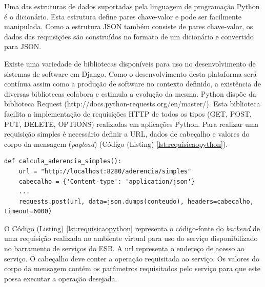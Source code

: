 Uma das estruturas de dados suportadas pela linguagem de programação Python é o dicionário. Esta estrutura define pares chave-valor e pode ser facilmente manipulada. Como a estrutura JSON também consiste de pares chave-valor, os dados das requisições são construídos no formato de um dicionário e convertido para JSON.

Existe uma variedade de bibliotecas disponíveis para uso no desenvolvimento de sistemas de software em Django. Como o desenvolvimento desta plataforma será contínua assim como a produção de software no contexto definido, a existência de diversas bibliotecas colabora e estimula a evolução da mesma. Python dispõe da biblioteca Request (http://docs.python-requests.org/en/master/). Esta biblioteca facilita a implementação de requisições HTTP de todos os tipos (GET, POST, PUT, DELETE, OPTIONS) realizadas em aplicações Python. Para realizar uma requisição simples é necessário definir a URL, dados de cabeçalho e valores do corpo da mensagem (\textit{payload}) (Código (Listing) \ref{lst:requisicaopython}).


\begin{lstlisting}[caption={Requisição HTTP em Python utilizando a biblioteca Request.},label={lst:requisicaopython}]
def calcula_aderencia_simples():
    url = "http://localhost:8280/aderencia/simples"
    cabecalho = {'Content-type': 'application/json'}
    ...
    requests.post(url, data=json.dumps(conteudo), headers=cabecalho, timeout=6000)
\end{lstlisting}

O Código (Listing) \ref{lst:requisicaopython} representa o código-fonte do \textit{backend} de uma requisição realizada no ambiente virtual para uso do serviço disponibilizado no barramento de serviços do ESB. A url representa o endereço de acesso ao serviço. O cabeçalho deve conter a operação requisitada ao serviço. Os valores do corpo da mensagem contém os parâmetros requisitados pelo serviço para que este possa executar a operação desejada.

